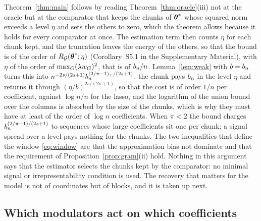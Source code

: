 Theorem~\ref{thm:main} follows by reading
Theorem~\ref{thm:oracle}(iii) not at the oracle but at the comparator that
keeps the chunks of $\boldsymbol{\theta}^{*}$ whose squared norm exceeds a level $\eta$ and
sets the others to zero, which the theorem allows because it holds for every
comparator at once. The estimation term then counts $\eta$ for each chunk
kept, and the truncation leaves the energy of the others, so that the bound is
of the order of $R_{\mathcal{G}}(\boldsymbol{\theta}^{*};\eta)$ (Corollary~S5.1 in the Supplementary
Material), with $\eta$ of the order of $\max_{G}(\lambda w_{G})^{2}$, that is of
$b_{n}/n$. Lemma~\ref{lem:weak} with $b = b_{n}$ turns this into
$n^{-2s/(2s+1)}b_{n}^{(2/\pi-1)_{+}/(2s+1)}$: the chunk pays $b_{n}$ in the level
$\eta$ and returns it through $(\eta/b)^{2s/(2s+1)}$, so that the cost is of
order $1/n$ per coefficient, against $\log n/n$ for the lasso, and the
logarithm of the union bound over the columns is absorbed by the size of the
chunks, which is why they must have at least of the order of $\log n$
coefficients. When $\pi < 2$ the bound charges
$b_{n}^{(2/\pi-1)/(2s+1)}$ to sequences whose large coefficients sit one per
chunk; a signal spread over a level pays nothing for the chunks. The two
inequalities that define the window \eqref{eq:window} are that the
approximation bias not dominate and that the requirement of
Proposition~\ref{prop:gram}(ii) hold. Nothing in this argument says that the
estimator selects the chunks kept by the comparator: no minimal signal or
irrepresentability condition is used.
The recovery that matters for the model is not of coordinates
but of blocks, and it is taken up next.


\subsection{Which modulators act on which coefficients}
\label{sec:selection}

